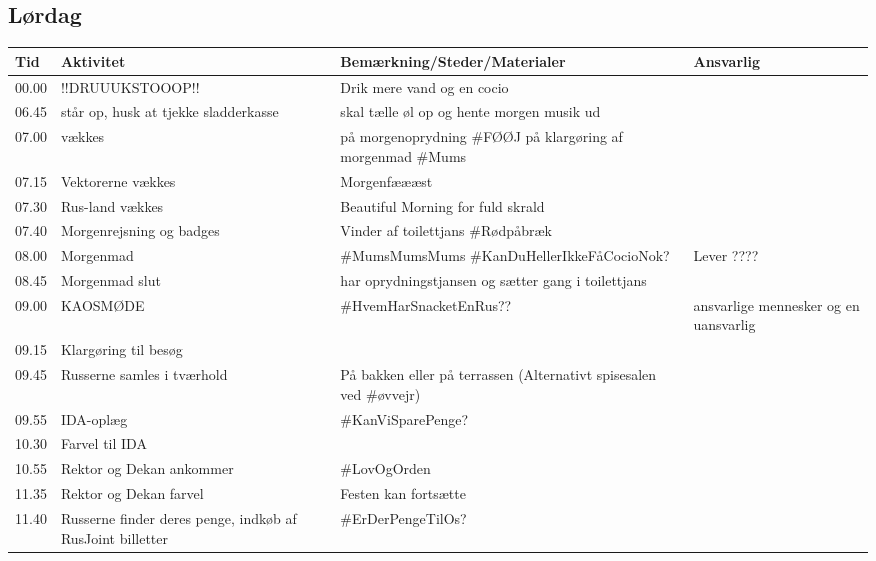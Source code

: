 \subsection{Lørdag}
\begin{tabular}{ | p{1cm} | p{4cm} | p{5.5cm} | p{4cm} | }
\hline
	Tid & Aktivitet & Bemærkning/Steder/Materialer & Ansvarlig \\ \hline
	00.00 & !!DRUUUKSTOOOP!! & Drik mere vand og en cocio & \Lucyfar \Ora \\ \hline
	06.45 & \BIATCH står op, husk at tjekke sladderkasse & \YOLO skal tælle øl op og hente morgen musik ud & \BIATCH \YOLO \\ \hline
	07.00 & \Alternative \Fransk vækkes & \Alternative på morgenoprydning \#FØØJ \Fransk på klargøring af morgenmad \#Mums & \BIATCH \\ \hline
	07.15 & Vektorerne vækkes & Morgenfæææst &  \\ \hline
	07.30 & Rus-land vækkes & Beautiful Morning for fuld skrald & \Alle \\ \hline
	07.40 & Morgenrejsning og badges & Vinder af toilettjans \#Rødpåbræk & \Alle \\ \hline
	08.00 & Morgenmad & \#MumsMumsMums \#KanDuHellerIkkeFåCocioNok? & Lever \Hyttebombz{}???? \\ \hline
	08.45 & Morgenmad slut & \Norder har oprydningstjansen og \Johnny sætter gang i toilettjans & \Hyttebombz{} \Johnny \\ \hline
	09.00 & KAOSMØDE & \#HvemHarSnacketEnRus?? & \Alle ansvarlige mennesker og en uansvarlig \Hyttebombz{} \\ \hline
	09.15 & Klargøring til besøg &  & \Ora \Lucyfar \Gabriel \\ \hline
	09.45 & Russerne samles i tværhold & På bakken eller på terrassen (Alternativt spisesalen ved \#øvvejr) &  \\ \hline
	09.55 & IDA-oplæg & \#KanViSparePenge? & \KABS \BIATCH \\ \hline
	10.30 & Farvel til IDA &  & \KABS \BIATCH \\ \hline
	10.55 & Rektor og Dekan ankommer & \#LovOgOrden & \KABS \\ \hline
	11.35 & Rektor og Dekan farvel & Festen kan fortsætte & \KABS \\ \hline
	11.40 & Russerne finder deres penge, indkøb af RusJoint billetter & \#ErDerPengeTilOs? & \Ora \Johnny \Gabriel \\ \hline
\end{tabular}

